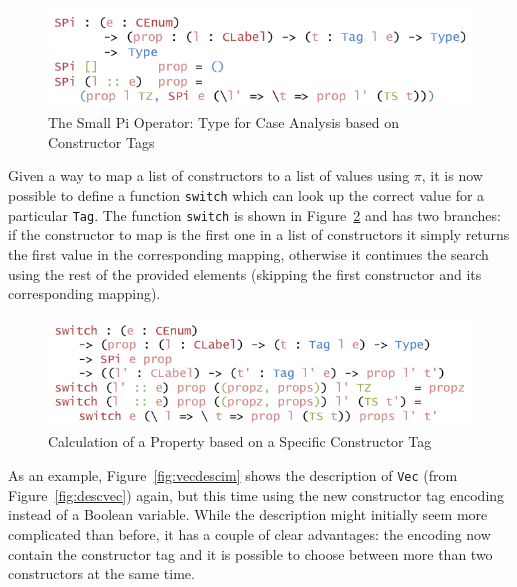 \documentclass{ituthesis}
\newcommand{\tttype}[1]{\textcolor{type-color}{\texttt{#1}}}
\newcommand{\ttdec}[1]{\textcolor{declared-var-color}{\texttt{#1}}}
\begin{document}
\begin{figure}[ht]
\begin{center}
    \includegraphics[scale=0.5]{Figures/AConstructiveTypeofChoice.png}
\end{center}
\caption{The Small Pi Operator: Type for Case Analysis based on Constructor Tags}
\label{fig:smallpiop}
\end{figure}

Given a way to map a list of constructors to a list of values using $\pi$, it is now possible to define a function \ttdec{switch} which can look up the correct value for a particular \tttype{Tag}.
The function \ttdec{switch} is shown in Figure~\ref{fig:switchctor} and has two branches: if the constructor to map is the first one in a list of constructors it simply returns the first value in the corresponding mapping, otherwise
it continues the search using the rest of the provided elements (skipping the first constructor and its corresponding mapping).

\begin{figure}[ht]
\begin{center}
    \includegraphics[scale=0.5]{Figures/AConstructiveChoice.png}
\end{center}
\caption{Calculation of a Property based on a Specific Constructor Tag}
\label{fig:switchctor}
\end{figure}

As an example, Figure~\ref{fig:vecdescim} shows the description of \tttype{Vec} (from Figure~\ref{fig:descvec}) again, but this time using the new constructor tag encoding instead of a Boolean variable.
While the description might initially seem more complicated than before, it has a couple of clear advantages: the encoding now contain the constructor tag and it is possible to choose between more than two constructors at the same time.
\end{document}
